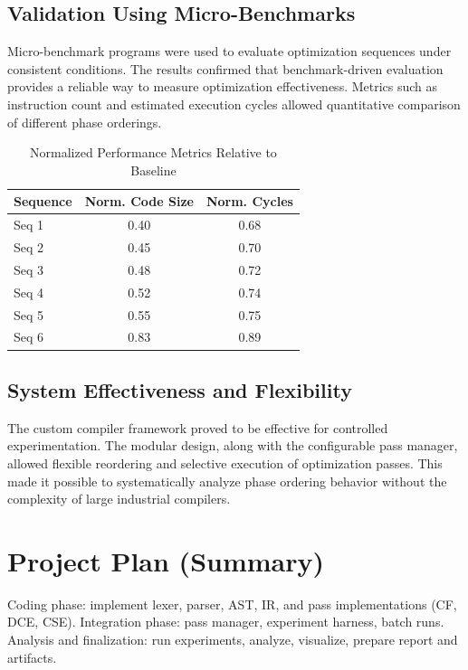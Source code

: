 \documentclass[conference]{IEEEtran}
\begin{document}
\subsection{Validation Using Micro-Benchmarks}
Micro-benchmark programs were used to evaluate optimization sequences under consistent conditions. The results confirmed that benchmark-driven evaluation provides a reliable way to measure optimization effectiveness. Metrics such as instruction count and estimated execution cycles allowed quantitative comparison of different phase orderings.

\begin{table}[!htbp]
\centering
\caption{Normalized Performance Metrics Relative to Baseline}
\label{tab:normalized_performance}
\renewcommand{\arraystretch}{1.2}
\begin{tabularx}{\columnwidth}{@{}Xcc@{}}
\toprule
\textbf{Sequence} & \textbf{Norm. Code Size} & \textbf{Norm. Cycles} \\
\midrule
Seq 1 & 0.40 & 0.68 \\
Seq 2 & 0.45 & 0.70 \\
Seq 3 & 0.48 & 0.72 \\
Seq 4 & 0.52 & 0.74 \\
Seq 5 & 0.55 & 0.75 \\
Seq 6 & 0.83 & 0.89 \\
\bottomrule
\end{tabularx}
\end{table}

\subsection{System Effectiveness and Flexibility}
The custom compiler framework proved to be effective for controlled experimentation. The modular design, along with the configurable pass manager, allowed flexible reordering and selective execution of optimization passes. This made it possible to systematically analyze phase ordering behavior without the complexity of large industrial compilers.

\section{Project Plan (Summary)}
Coding phase: implement lexer, parser, AST, IR, and pass implementations (CF, DCE, CSE). Integration phase: pass manager, experiment harness, batch runs. Analysis and finalization: run experiments, analyze, visualize, prepare report and artifacts.
\end{document}
